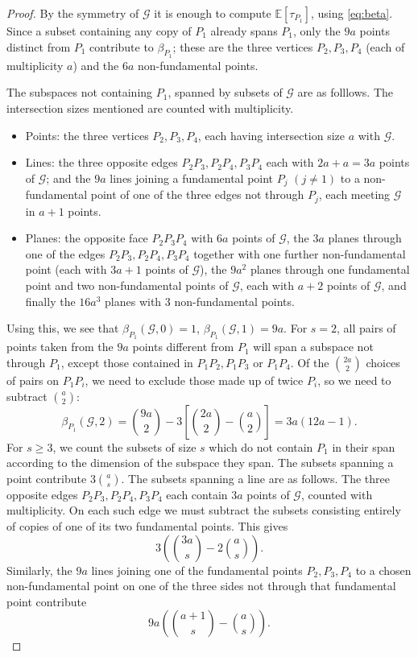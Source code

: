 \documentclass{article}
\newcommand{\Gscr}{\mathscr{G}}
\newcommand{\E}{\mathbb{E}}
\begin{document}
\begin{proof}
By the symmetry of $\Gscr$ it is enough to compute $\E[\tau_{P_1}]$, using \eqref{eq:beta}. Since a
subset containing any copy of $P_1$ already spans $P_1$, only the $9a$ points distinct from $P_1$
contribute to $\beta_{P_1}$; these are the three vertices $P_2,P_3,P_4$ (each of multiplicity $a$)
and the $6a$ non-fundamental points.

The subspaces not containing $P_1$, spanned by subsets of $\Gscr$ are as folllows. The intersection sizes mentioned are counted with multiplicity.

\begin{itemize}
    \item Points: the three vertices $P_2,P_3,P_4$, each having intersection size $a$ with $\Gscr.$
    \item Lines: the three opposite edges $P_2P_3,P_2P_4,P_3P_4$ each with $2a+a=3a$ points of $\Gscr$; and the $9a$ lines joining a fundamental point
    $P_j$ $(j\ne1)$ to a non-fundamental point of one of the three edges not through $P_j$, each meeting $\Gscr$ in $a+1$ points. 
    \item Planes: the opposite face $P_2P_3P_4$ with $6a$ points of $\Gscr$, the $3a$ planes through one of the edges $P_2P_3,P_2P_4,P_3P_4$ together with one further non-fundamental point (each with $3a+1$ points of $\Gscr$), the $9a^2$ planes through one fundamental point and two non-fundamental points of $\Gscr$, each with $a+2$ points of $\Gscr$, and finally the $16a^3$ planes with $3$ non-fundamental points.
\end{itemize}


Using this, we see that $\beta_{P_1}(\Gscr,0)=1$, $\beta_{P_1}(\Gscr,1)=9a$. For $s=2$, all pairs of points taken from the $9a$ points different from $P_1$ will span a subspace not through $P_1$, except those contained in $P_1P_2,P_1P_3$ or $P_1P_4$. Of the $\binom{2a}{2}$ choices of pairs on $P_1P_i$, we need to exclude those made up of twice $P_i$, so we need to subtract $\binom{a}{2}$:
\[
\beta_{P_1}(\Gscr,2)
=\binom{9a}{2}
-3\left[\binom{2a}{2}-\binom{a}{2}\right]
=3a(12a-1).
\]
For $s\geq 3$, we count the subsets of size $s$ which do not contain $P_1$
in their span according to the dimension of the subspace they span. The subsets spanning a point contribute $3\binom{a}{s}$.
The subsets spanning a line are as follows. The three opposite edges
$P_2P_3,P_2P_4,P_3P_4$ each contain $3a$ points of $\Gscr$, counted with
multiplicity. On each such edge we must subtract the subsets consisting
entirely of copies of one of its two fundamental points. This gives
\[
3\left(\binom{3a}{s}-2\binom{a}{s}\right).
\]
Similarly, the $9a$ lines joining one of the fundamental points
$P_2,P_3,P_4$ to a chosen non-fundamental point on one of the three sides
not through that fundamental point contribute
\[
9a\left(\binom{a+1}{s}-\binom{a}{s}\right).
\]


\end{proof}
\end{document}
